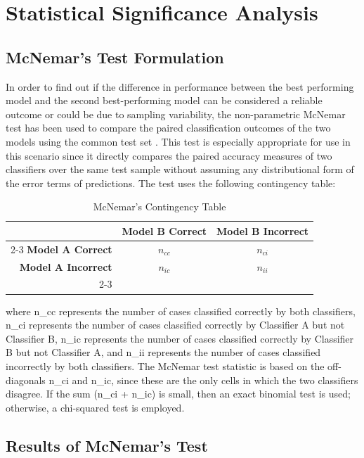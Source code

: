 \documentclass[journal]{IEEEtran}
\begin{document}
\section{Statistical Significance Analysis}

\subsection{McNemar's Test Formulation}

    In order to find out if the difference in performance between the best performing model and the second best-performing model can be considered a reliable outcome or could be due to sampling variability, the non-parametric McNemar test has been used to compare the paired classification outcomes of the two models using the common test set \cite{ref17}. This test is especially appropriate for use in this scenario since it directly compares the paired accuracy measures of two classifiers over the same test sample without assuming any distributional form of the error terms of predictions.
    The test uses the following contingency table:
\begin{table}[htbp]
\centering
\caption{McNemar's Contingency Table}
\label{tab:mcnemar}
\begin{tabular}{r|cc|}
\multicolumn{1}{c}{} & \textbf{Model B Correct} & \multicolumn{1}{c}{\textbf{Model B Incorrect}} \\ \cline{2-3}
\textbf{Model A Correct} & $n_{cc}$ & $n_{ci}$ \\
\textbf{Model A Incorrect} & $n_{ic}$ & $n_{ii}$ \\ \cline{2-3}
\end{tabular}
\end{table}

where n\_cc represents the number of cases classified correctly by both classifiers, n\_ci represents the number of cases classified correctly by Classifier A but not Classifier B, n\_ic represents the number of cases classified correctly by Classifier B but not Classifier A, and n\_ii represents the number of cases classified incorrectly by both classifiers. The McNemar test statistic is based on the off-diagonals n\_ci and n\_ic, since these are the only cells in which the two classifiers disagree. If the sum (n\_ci + n\_ic) is small, then an exact binomial test is used; otherwise, a chi-squared test is employed.

\subsection{Results of McNemar's Test}
\end{document}
